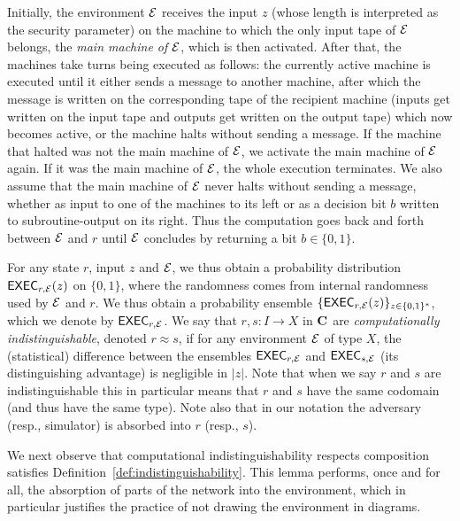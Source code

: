 Initially, the environment $\mathcal{E}$ receives the input $z$ (whose length is interpreted as the security parameter) on the machine to which the only input tape of $\mathcal{E}$ belongs, the \emph{main machine of $\mathcal{E}$}, which is then activated. After that, the machines take turns being executed as follows: the currently active machine is executed until it either sends a message to another machine, after which the message is written on the corresponding tape of the recipient machine (\ie inputs get written on the input tape and outputs get written on the output tape) which now becomes active, or the machine halts without sending a message. If the machine that halted was not the main machine of $\mathcal{E}$, we activate the main machine of $\mathcal{E}$ again. If it was the main machine of  $\mathcal{E}$, the whole execution terminates. We also assume that the main machine of $\mathcal{E}$ never halts without sending a message, whether as input to one of the machines to its left or as a decision bit $b$ written to subroutine-output on its right. Thus the computation goes back and forth between $\mathcal{E}$ and $r$ until $\mathcal{E}$ concludes by returning a bit $b\in\{0,1\}$. 

For any state $r$, input $z$ and $\mathcal{E}$, we thus obtain a probability distribution $\mathsf{EXEC}_{r,\mathcal{E}}(z)$ on $\{0,1\}$, where the randomness comes from internal randomness used by $\mathcal{E}$ and $r$. We thus obtain a probability ensemble $\{\mathsf{EXEC}_{r,\mathcal{E}}(z)\}_{z\in\{0,1\}^*}$, which we denote by $\mathsf{EXEC}_{r,\mathcal{E}}$. We say that $r,s \colon I\to X$ in $\mathbf{C}$ are \emph{computationally indistinguishable}, denoted $r\approx s$, if for any environment $\mathcal{E}$ of type $X$, the (statistical) difference between the ensembles $\mathsf{EXEC}_{r,\mathcal{E}}$ and $\mathsf{EXEC}_{s,\mathcal{E}}$ (\ie its distinguishing advantage) is negligible in $\left\vert z\right\vert$. Note that when we say $r$ and $s$ are indistinguishable this in particular means that $r$ and $s$ have the same codomain (and thus have the same type). Note also that in our notation the adversary (resp., simulator) is absorbed into $r$ (resp., $s$). 

We next observe that computational indistinguishability respects composition \ie satisfies Definition~\ref{def:indistinguishability}. This lemma performs, once and for all, the absorption of parts of the network into the environment, which in particular justifies the practice of not drawing the environment in diagrams.

